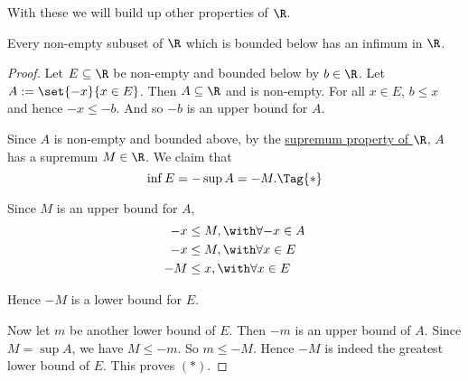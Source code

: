 With these we will build up other properties of $\R$.

\label{ab2a2fe}

Every non-empty subuset of $\R$ which is bounded below has an infimum in $\R$.

\begin{proof}

  Let $E\subseteq\R$ be non-empty and bounded below by $b\in\R$. Let
  $A:=\set{-x}{x\in E}$. Then $A\subseteq\R$ and is non-empty. For all $x\in E$,
  $b\leq x$ and hence $-x\leq-b$. And so $-b$ is an upper bound for $A$.

  Since $A$ is non-empty and bounded above, by the \href{f330cf9}{supremum
  property of $\R$}, $A$ has a supremum $M\in\R$. We claim that
  \begin{equation*}
    \inf E=-\sup A=-M.\Tag{*}
  \end{equation*}

  Since $M$ is an upper bound for $A$,
  \begin{align*}
    -x &\leq M,\with\forall{-x}\in A \\
    -x &\leq M,\with\forall{x}\in E  \\
    -M &\leq x,\with\forall{x}\in E
  \end{align*}

  Hence $-M$ is a lower bound for $E$.

  Now let $m$ be another lower bound of $E$. Then $-m$ is an upper bound of $A$.
  Since $M=\sup A$, we have $M\leq-m$. So $m\leq-M$. Hence $-M$ is indeed the
  greatest lower bound of $E$. This proves $(*)$.
\end{proof}
